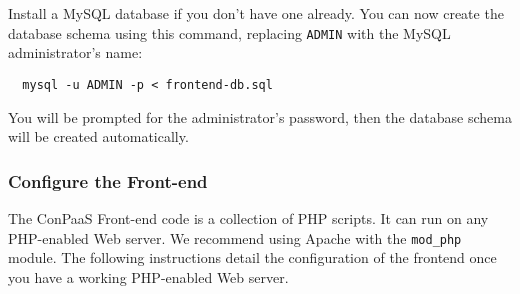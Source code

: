\documentclass[10pt]{article}
\begin{document}
Install a MySQL database if you don't have one already. You can now
create the database schema using this command, replacing \verb+ADMIN+
with the MySQL administrator's name:

\begin{verbatim}
  mysql -u ADMIN -p < frontend-db.sql
\end{verbatim}

You will be prompted for the administrator's password, then the
database schema will be created automatically.

\subsubsection{Configure the Front-end}

The ConPaaS Front-end code is a collection of PHP scripts. It can run
on any PHP-enabled Web server. We recommend using Apache with the
\verb+mod_php+ module. The following instructions detail the
configuration of the frontend once you have a working PHP-enabled Web
server.
\end{document}
